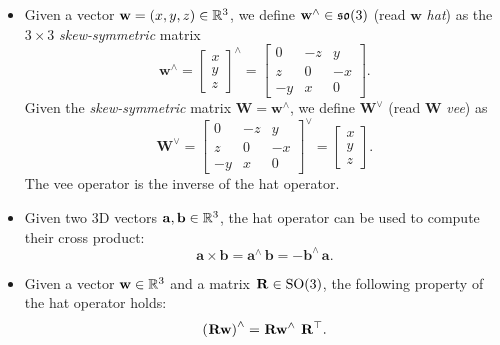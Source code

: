 \begin{itemize}
\item
Given a vector $\mathbf{w} = (x, y, z) \in \mathbb{R}^3$, we define $\mathbf{w}^\wedge \in \mathfrak{so}(3)$ (read $\mathbf{w}$ \emph{hat}) as the $3 \times 3$ \emph{skew-symmetric} matrix
%
\begin{equation*}
    \mathbf{w}^\wedge = \begin{bmatrix} x \\ y \\ z \end{bmatrix}^\wedge = \begin{bmatrix} 0 & -z & y \\ z & 0 & -x \\ -y & x & 0 \end{bmatrix}
    .
\end{equation*}
%
Given the \emph{skew-symmetric} matrix $\mathbf{W} = \mathbf{w}^\wedge$, we define $\mathbf{W}^\vee$ (read $\mathbf{W}$ \emph{vee}) as
%
\begin{equation*}
    \mathbf{W}^\vee = \begin{bmatrix} 0 & -z & y \\ z & 0 & -x \\ -y & x & 0 \end{bmatrix}^\vee = \begin{bmatrix} x \\ y \\ z \end{bmatrix}.
\end{equation*}
%
The vee operator is the inverse of the hat operator.

\item Given two 3D vectors $\mathbf{a}, \mathbf{b} \in \mathbb{R}^3$, the hat operator can be used to compute their cross product:
%
\begin{equation*}
    \mathbf{a} \times \mathbf{b} = \mathbf{a}^ \wedge \, \mathbf{b} = - \mathbf{b}^\wedge \, \mathbf{a}
    .
\end{equation*}

\item Given a vector $\mathbf{w} \in \mathbb{R}^3$ and a matrix $\prescript{}{}{\mathbf{R}} \in \text{SO}(3)$, the following property of the hat operator holds:
%
\begin{equation*}
    \left( \prescript{}{}{\mathbf{R}} \mathbf{w} \right)^\wedge = \prescript{}{}{\mathbf{R}} \mathbf{w}^\wedge \, \prescript{}{}{\mathbf{R}}^\top
    .
\end{equation*}


\end{itemize}
